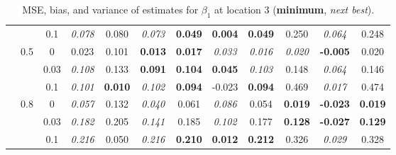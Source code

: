 \documentclass[authoryear, review, 11pt]{elsarticle}
\begin{document}
\begin{table}[ht]
\begin{center}
\begin{tabular}{ccc | ccc | ccc | ccc }
 &  & 0.1 &   \emph{0.078} & 0.080 & \emph{0.073} & \textbf{0.049} & \textbf{0.004} & \textbf{0.049} & 0.250 & \emph{0.064} & 0.248 \\ \cline{2-12}
 & \multirow{3}{*}{0.5} & 0 &   0.023 & 0.101 & \textbf{0.013} & \textbf{0.017} & \emph{0.033} & \emph{0.016} & \emph{0.020} & \textbf{-0.005} & 0.020 \\ 
 &  & 0.03 &   \emph{0.108} & 0.133 & \textbf{0.091} & \textbf{0.104} & \textbf{0.045} & \emph{0.103} & 0.148 & \emph{0.064} & 0.146 \\ 
 &  & 0.1 &   \emph{0.101} & \textbf{0.010} & \emph{0.102} & \textbf{0.094} & -0.023 & \textbf{0.094} & 0.469 & \emph{0.017} & 0.474 \\ \cline{2-12}
 & \multirow{3}{*}{0.8} & 0 &   \emph{0.057} & 0.132 & \emph{0.040} & 0.061 & \emph{0.086} & 0.054 & \textbf{0.019} & \textbf{-0.023} & \textbf{0.019} \\ 
 &  & 0.03 &   \emph{0.182} & 0.205 & \emph{0.141} & 0.185 & \emph{0.102} & 0.177 & \textbf{0.128} & \textbf{-0.027} & \textbf{0.129} \\ 
 &  & 0.1 &   \emph{0.216} & 0.050 & \emph{0.216} & \textbf{0.210} & \textbf{0.012} & \textbf{0.212} & 0.326 & \emph{0.029} & 0.328 \\ 
  \end{tabular}
\caption{MSE, bias, and variance of estimates for $\beta_1$ at location 3 (\textbf{minimum}, \emph{next best}).}
\end{center}
\end{table}
\end{document}
